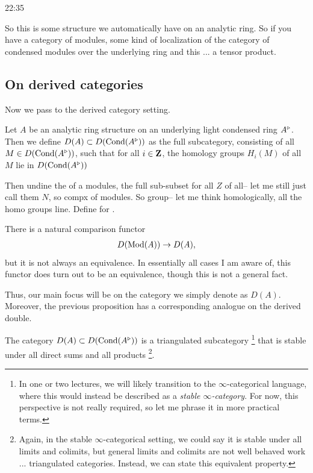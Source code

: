 \begin{unfinished}{22:35}

So this is some structure we automatically have on an analytic ring. So if you have a category of modules, some kind of localization of the category of condensed modules over the underlying ring and this ...  a tensor product.

\subsection{On derived categories}
Now we pass to the derived category setting.


\bd
Let $A$ be an analytic ring structure on an underlying light condensed ring $A^\triangleright$.
Then we define $D(A) \subset D(\mathrm{Cond}(A^\triangleright))$ as the full subcategory, consisting of all $M \in D(\mathrm{Cond}(A^\triangleright))$, such that for all $i \in \mathbf Z$, the homology groups $H_i(M)$ of all $M$ lie in $D(\mathrm{Cond}(A^\triangleright))$ 
\ed


Then undine the of a modules, the full sub-subset for all $Z$ of all-- let me still just call them $N$, so compx of modules. So group-- let me think homologically, all the homo groups line. Define for .

\begin{warning}
There is a natural comparison functor 
\begin{align*}
D(\operatorname{Mod}(A)) \to D(A),
\end{align*}
but it is not always an equivalence.
In essentially all cases I am aware of, this functor does turn out to be an equivalence, though this is not a general fact.
\end{warning}

Thus, our main focus will be on the category we simply denote as $D(A)$. 
Moreover, the previous proposition has a corresponding analogue on the derived double.

\bp
The category $D(A) \subset D(\mathrm{Cond}(A^\triangleright))$ is a triangulated subcategory \footnote{In one or two lectures, we will likely transition to the $\infty$-categorical language, where this would instead be described as a \emph{stable $\infty$-category}. For now, this perspective is not really required, so let me phrase it in more practical terms.} that is stable under all direct sums and all products \footnote{Again, in the stable $\infty$-categorical setting, we could say it is stable under all limits and colimits, but general limits and colimits are not well behaved work ...  triangulated categories. Instead, we can state this equivalent property.}.


\end{unfinished}

